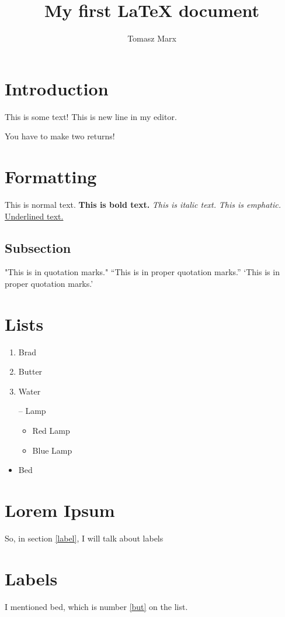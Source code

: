 \documentclass{article}
\author{Tomasz Marx}
\title{My first {\LaTeX} document}
\begin{document}
\maketitle
\section{Introduction}
This is some text!
This is new line in my editor.

You have to make two returns!

\section{Formatting}

This is normal text.
\textbf{This is bold text.}
\textit{This is italic text.}
\emph{This is emphatic.}
\underline{Underlined text.}

\subsection{Subsection}
"This is in quotation marks."
``This is in proper quotation marks.''
`This is in proper quotation marks.'

\section{Lists}
\begin{enumerate}
\item Brad
\item Butter\label{but}
\item Water
\end{enumerate}

\begin{itemize}
    \item[--] Lamp
    \begin{itemize}
    \item Red Lamp
    \item Blue Lamp
    \end{itemize}
\item Bed
\end{itemize}

\section{Lorem Ipsum}
So, in section \ref{label}, I will talk about labels

\section{Labels\label{label}}
I mentioned bed, which is number \ref{but} on the list.
\end{document}
